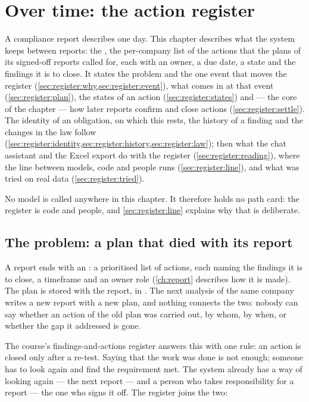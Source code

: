 \chapter{Over time: the action register}\label{ch:register}

A compliance report describes one day. This chapter describes what the system keeps between
reports: the , the per-company list of the actions that the plans of its
signed-off reports called for, each with an owner, a due date, a state and the findings it is
to close. It states the problem and the one event that moves the register
(\cref{sec:register:why,sec:register:event}), what comes in at that event
(\cref{sec:register:plan}), the states of an action (\cref{sec:register:states}) and --- the
core of the chapter --- how later reports confirm and close actions
(\cref{sec:register:settle}). The identity of an obligation, on which this rests, the history
of a finding and the changes in the law follow
(\cref{sec:register:identity,sec:register:history,sec:register:law}); then what the chat
assistant and the Excel export do with the register (\cref{sec:register:reading}), where the
line between models, code and people runs (\cref{sec:register:line}), and what was tried on
real data (\cref{sec:register:tried}).

No model is called anywhere in this chapter. It therefore holds no path card: the register is
code and people, and \cref{sec:register:line} explains why that is deliberate.


\section{The problem: a plan that died with its report}\label{sec:register:why}

A report ends with an : a prioritised list of actions, each naming the
findings it is to close, a timeframe and an owner role (\cref{ch:report} describes how it is
made). The plan is stored with the report, in . The next analysis of the
same company writes a new report with a new plan, and nothing connects the two: nobody can say
whether an action of the old plan was carried out, by whom, by when, or whether the gap it
addressed is gone.

The course's findings-and-actions register answers this with one rule: an action is closed
only after a re-test. Saying that the work was done is not enough; someone has to look again
and find the requirement met. The system already has a way of looking again --- the next
report --- and a person who takes responsibility for a report --- the one who signs it off.
The register joins the two:

